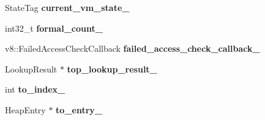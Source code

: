 \begin{DoxyCompactItemize}
\item 
\hypertarget{classv8_1_1internal_1_1_b_a_s_e___e_m_b_e_d_d_e_d_ab9bf9fdcc8449ee757d4358d13e948af}{}State\+Tag {\bfseries current\+\_\+vm\+\_\+state\+\_\+}\label{classv8_1_1internal_1_1_b_a_s_e___e_m_b_e_d_d_e_d_ab9bf9fdcc8449ee757d4358d13e948af}

\item 
\hypertarget{classv8_1_1internal_1_1_b_a_s_e___e_m_b_e_d_d_e_d_a0bbb8681afd01225ea3105056232d07b}{}int32\+\_\+t {\bfseries formal\+\_\+count\+\_\+}\label{classv8_1_1internal_1_1_b_a_s_e___e_m_b_e_d_d_e_d_a0bbb8681afd01225ea3105056232d07b}

\item 
\hypertarget{classv8_1_1internal_1_1_b_a_s_e___e_m_b_e_d_d_e_d_a7323f0bd95ca34778b1c4fc6b9c4dd73}{}v8\+::\+Failed\+Access\+Check\+Callback {\bfseries failed\+\_\+access\+\_\+check\+\_\+callback\+\_\+}\label{classv8_1_1internal_1_1_b_a_s_e___e_m_b_e_d_d_e_d_a7323f0bd95ca34778b1c4fc6b9c4dd73}

\item 
\hypertarget{classv8_1_1internal_1_1_b_a_s_e___e_m_b_e_d_d_e_d_af19cac009b8fec26bd80c52189d3617e}{}Lookup\+Result $\ast$ {\bfseries top\+\_\+lookup\+\_\+result\+\_\+}\label{classv8_1_1internal_1_1_b_a_s_e___e_m_b_e_d_d_e_d_af19cac009b8fec26bd80c52189d3617e}

\item 
\hypertarget{classv8_1_1internal_1_1_b_a_s_e___e_m_b_e_d_d_e_d_ab6949618d182722ab889f5fbcd7f457a}{}int {\bfseries to\+\_\+index\+\_\+}\label{classv8_1_1internal_1_1_b_a_s_e___e_m_b_e_d_d_e_d_ab6949618d182722ab889f5fbcd7f457a}

\item 
\hypertarget{classv8_1_1internal_1_1_b_a_s_e___e_m_b_e_d_d_e_d_a90bff3c4154489eb012f100c57e0823b}{}Heap\+Entry $\ast$ {\bfseries to\+\_\+entry\+\_\+}\label{classv8_1_1internal_1_1_b_a_s_e___e_m_b_e_d_d_e_d_a90bff3c4154489eb012f100c57e0823b}

\end{DoxyCompactItemize}

